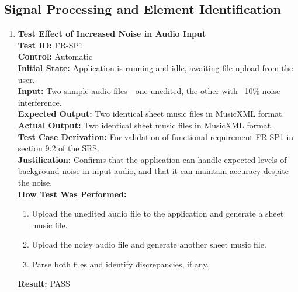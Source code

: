 \documentclass[12pt, titlepage]{article}
\begin{document}
  \subsection{Signal Processing and Element Identification}
  \begin{enumerate}
    \item \textbf{Test Effect of Increased Noise in Audio Input} \\
      \newline
      \textbf{Test ID:} FR-SP1 \\
      \textbf{Control:} Automatic \\
      \textbf{Initial State:} Application is running and idle, awaiting file upload from the user. \\
      \textbf{Input:} Two sample audio files—one unedited, the other with ~10\% noise interference. \\
      \textbf{Expected Output:} Two identical sheet music files in MusicXML format. \\
      \textbf{Actual Output:} Two identical sheet music files in MusicXML format. \\
      \textbf{Test Case Derivation:} For validation of functional requirement FR-SP1 in section 9.2 of the 
      \href{https://github.com/emilyperica/ScoreGen/blob/main/docs/SRS-Volere/SRS.pdf}{SRS}. \\
      \textbf{Justification:} Confirms that the application can handle expected levels of background noise in input 
      audio, and that it can maintain accuracy despite the noise.\\
      \textbf{How Test Was Performed:}
      \begin{enumerate}
          \item Upload the unedited audio file to the application and generate a sheet music file.
          \item Upload the noisy audio file and generate another sheet music file.
          \item Parse both files and identify discrepancies, if any.
      \end{enumerate}
      \textbf{Result:} PASS
    

\end{enumerate}
\end{document}
